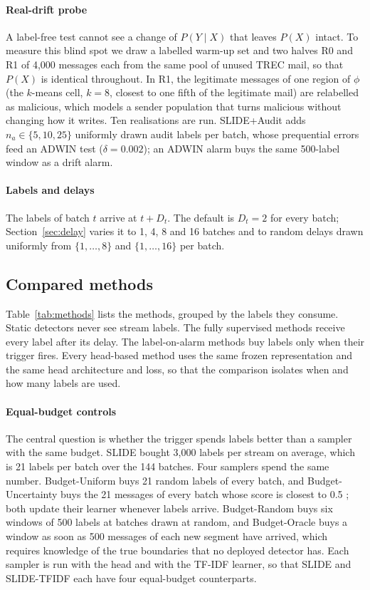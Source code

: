 \paragraph{Real-drift probe} A label-free test cannot see a change of $P(Y\mid X)$ that leaves $P(X)$ intact. To measure this blind spot we draw a labelled warm-up set and two halves R0 and R1 of 4{,}000 messages each from the same pool of unused TREC mail, so that $P(X)$ is identical throughout. In R1, the legitimate messages of one region of $\phi$ (the $k$-means cell, $k=8$, closest to one fifth of the legitimate mail) are relabelled as malicious, which models a sender population that turns malicious without changing how it writes. Ten realisations are run. SLIDE+Audit adds $n_a\in\{5,10,25\}$ uniformly drawn audit labels per batch, whose prequential errors feed an ADWIN test ($\delta=0.002$); an ADWIN alarm buys the same 500-label window as a drift alarm.

\paragraph{Labels and delays} The labels of batch $t$ arrive at $t+D_t$. The default is $D_t=2$ for every batch; Section~\ref{sec:delay} varies it to 1, 4, 8 and 16 batches and to random delays drawn uniformly from $\{1,\dots,8\}$ and $\{1,\dots,16\}$ per batch.

\subsection{Compared methods}
Table~\ref{tab:methods} lists the methods, grouped by the labels they consume. Static detectors never see stream labels. The fully supervised methods receive every label after its delay. The label-on-alarm methods buy labels only when their trigger fires. Every head-based method uses the same frozen representation and the same head architecture and loss, so that the comparison isolates when and how many labels are used.



\paragraph{Equal-budget controls} The central question is whether the trigger spends labels better than a sampler with the same budget. SLIDE bought 3{,}000 labels per stream on average, which is 21 labels per batch over the 144 batches. Four samplers spend the same number. Budget-Uniform buys 21 random labels of every batch, and Budget-Uncertainty buys the 21 messages of every batch whose score is closest to 0.5 \cite{zliobaite2014}; both update their learner whenever labels arrive. Budget-Random buys six windows of 500 labels at batches drawn at random, and Budget-Oracle buys a window as soon as 500 messages of each new segment have arrived, which requires knowledge of the true boundaries that no deployed detector has. Each sampler is run with the head and with the TF-IDF learner, so that SLIDE and SLIDE-TFIDF each have four equal-budget counterparts.

